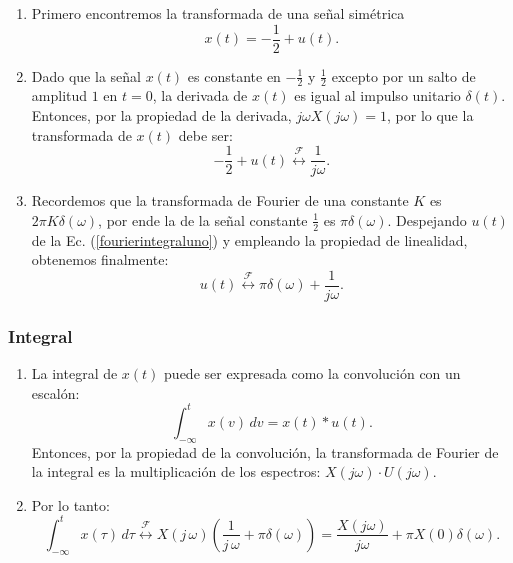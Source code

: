 \begin{enumerate}
	
	\item Primero encontremos la transformada de una señal simétrica 
	\begin{equation}
		x(t) = -\frac{1}{2} + u(t).
	\end{equation}
	
	\item Dado que la señal $x(t)$ es constante en $-\frac{1}{2}$ y $\frac{1}{2}$ excepto por un salto de amplitud $1$ en $t=0$, la derivada de $x(t)$ es igual al impulso unitario $\delta(t)$.
	Entonces, por la propiedad de la derivada, $j\omega X(j\omega) = 1$, por lo que la transformada de $x(t)$ debe ser:
	\begin{equation}
		-\frac{1}{2} + u(t) \stackrel{\mathcal{F}}{\longleftrightarrow} \frac{1}{j \omega}. \label{fourierintegraluno}
	\end{equation}
	
	\item Recordemos que la transformada de Fourier de una constante $K$ es $2\pi K \delta(\omega)$, por ende la de la señal constante $\frac{1}{2}$ es $\pi \delta(\omega)$. Despejando $u(t)$ de la Ec. (\ref{fourierintegraluno}) y empleando la propiedad de linealidad, obtenemos finalmente:
	\begin{equation}
		u(t) \stackrel{\mathcal{F}}{\longleftrightarrow} \pi \delta(\omega) + \frac{1}{j \omega}.
	\end{equation}
	
\end{enumerate}

\subsubsection{Integral}

\begin{enumerate}
	
	\item La integral de $x(t)$ puede ser expresada como la convolución con un escalón:
	\begin{equation}
		\int_{-\infty}^{t} x(v) \, dv = x(t) * u(t).
	\end{equation}
	Entonces, por la propiedad de la convolución, la transformada de Fourier de la integral es la multiplicación de los espectros: $X(j\omega) \cdot U(j\omega)$.
	\item Por lo tanto:
	\begin{equation}
		\int_{-\infty}^{t} x(\tau) \, d\tau \stackrel{\mathcal{F}}{\longleftrightarrow} X(j \, \omega) \left( \frac{1}{j \, \omega} + \pi \delta(\omega) \right) = \frac{X(j\omega)}{j \omega} + \pi X(0) \delta(\omega).
	\end{equation}
\end{enumerate}
